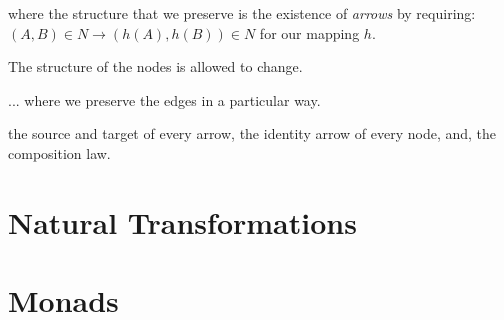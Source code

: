 where the structure that we preserve is the existence of \textit{arrows} 
by requiring: $(A,B) \in N \rightarrow (h(A), h(B)) \in N$ for our 
mapping $h$. 

\begin{example}

\end{example}

The structure of the nodes is allowed to change. 


... where we preserve the edges in a particular way. 

the source and target of every arrow, the identity arrow of every node, 
and, the composition law.


\section{Natural Transformations}

\section{Monads}